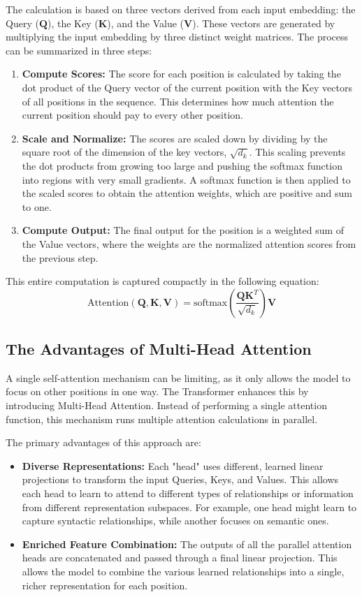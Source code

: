 The calculation is based on three vectors derived from each input embedding: the Query (\(\mathbf{Q}\)), the Key (\(\mathbf{K}\)), and the Value (\(\mathbf{V}\)). These vectors are generated by multiplying the input embedding by three distinct weight matrices.
The process can be summarized in three steps:
\begin{enumerate}
    \item \textbf{Compute Scores:} The score for each position is calculated by taking the dot product of the Query vector of the current position with the Key vectors of all positions in the sequence. This determines how much attention the current position should pay to every other position.
    \item \textbf{Scale and Normalize:} The scores are scaled down by dividing by the square root of the dimension of the key vectors, \(\sqrt{d_k}\). This scaling prevents the dot products from growing too large and pushing the softmax function into regions with very small gradients. A softmax function is then applied to the scaled scores to obtain the attention weights, which are positive and sum to one.
    \item \textbf{Compute Output:} The final output for the position is a weighted sum of the Value vectors, where the weights are the normalized attention scores from the previous step.
\end{enumerate}
This entire computation is captured compactly in the following equation:
\begin{equation}
    \text{Attention}(\mathbf{Q}, \mathbf{K}, \mathbf{V}) = \text{softmax}\left(\frac{\mathbf{Q}\mathbf{K}^T}{\sqrt{d_k}}\right)\mathbf{V}
    \label{eq:self_attention}
\end{equation}

\subsection{The Advantages of Multi-Head Attention}
A single self-attention mechanism can be limiting, as it only allows the model to focus on other positions in one way. The Transformer enhances this by introducing Multi-Head Attention. Instead of performing a single attention function, this mechanism runs multiple attention calculations in parallel.

The primary advantages of this approach are:
\begin{itemize}
    \item \textbf{Diverse Representations:} Each "head" uses different, learned linear projections to transform the input Queries, Keys, and Values. This allows each head to learn to attend to different types of relationships or information from different representation subspaces. For example, one head might learn to capture syntactic relationships, while another focuses on semantic ones.
    \item \textbf{Enriched Feature Combination:} The outputs of all the parallel attention heads are concatenated and passed through a final linear projection. This allows the model to combine the various learned relationships into a single, richer representation for each position.
\end{itemize}

